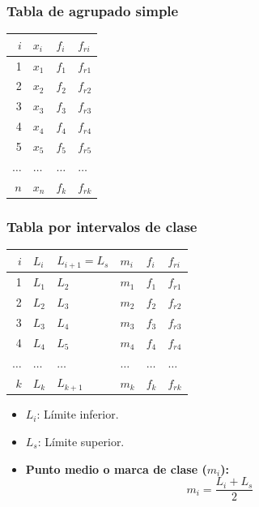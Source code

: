 \documentclass[11pt]{article}
\begin{document}
\subsubsection{Tabla de agrupado simple}
\label{sec:org302b0e6}
\begin{center}
\begin{tabular}{rlll}
\(i\) & \(x_i\) & \(f_i\) & \(f_{ri}\)\\[0pt]
\hline
1 & \(x_1\) & \(f_1\) & \(f_{r1}\)\\[0pt]
2 & \(x_2\) & \(f_2\) & \(f_{r2}\)\\[0pt]
3 & \(x_3\) & \(f_3\) & \(f_{r3}\)\\[0pt]
4 & \(x_4\) & \(f_4\) & \(f_{r4}\)\\[0pt]
5 & \(x_5\) & \(f_5\) & \(f_{r5}\)\\[0pt]
\(\dots\) & \(\dots\) & \(\dots\) & \(\dots\)\\[0pt]
\(n\) & \(x_n\) & \(f_k\) & \(f_{rk}\)\\[0pt]
\end{tabular}
\end{center}

\subsubsection{Tabla por intervalos de clase}
\label{sec:orgb146d11}
\begin{center}
\begin{tabular}{rlllll}
\(i\) & \(L_i\) & \(L_{i+1} = L_s\) & \(m_i\) & \(f_i\) & \(f_{ri}\)\\[0pt]
\hline
1 & \(L_1\) & \(L_2\) & \(m_1\) & \(f_1\) & \(f_{r1}\)\\[0pt]
2 & \(L_2\) & \(L_3\) & \(m_2\) & \(f_2\) & \(f_{r2}\)\\[0pt]
3 & \(L_3\) & \(L_4\) & \(m_3\) & \(f_3\) & \(f_{r3}\)\\[0pt]
4 & \(L_4\) & \(L_5\) & \(m_4\) & \(f_4\) & \(f_{r4}\)\\[0pt]
\(\dots\) & \(\dots\) & \(\dots\) & \(\dots\) & \(\dots\) & \(\dots\)\\[0pt]
\(k\) & \(L_k\) & \(L_{k+1}\) & \(m_k\) & \(f_k\) & \(f_{rk}\)\\[0pt]
\end{tabular}
\end{center}

\begin{itemize}
\item \(L_i\): Límite inferior.
\item \(L_s\): Límite superior.
\item \textbf{Punto medio o marca de clase (\(m_i\)):} $$\displaystyle m_i = \frac{L_i + L_s}{2}$$
\end{itemize}
\end{document}
